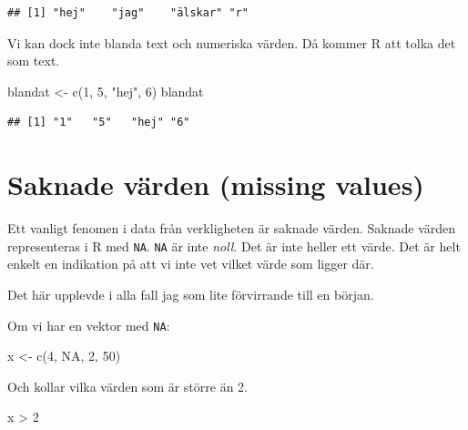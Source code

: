 \documentclass[
]{book}
\newenvironment{Shaded}{\begin{snugshade}}{\end{snugshade}}
\newcommand{\ConstantTok}[1]{\textcolor[rgb]{0.00,0.00,0.00}{#1}}
\newcommand{\DecValTok}[1]{\textcolor[rgb]{0.00,0.00,0.81}{#1}}
\newcommand{\FunctionTok}[1]{\textcolor[rgb]{0.00,0.00,0.00}{#1}}
\newcommand{\NormalTok}[1]{#1}
\newcommand{\OtherTok}[1]{\textcolor[rgb]{0.56,0.35,0.01}{#1}}
\newcommand{\SpecialCharTok}[1]{\textcolor[rgb]{0.00,0.00,0.00}{#1}}
\newcommand{\StringTok}[1]{\textcolor[rgb]{0.31,0.60,0.02}{#1}}
\begin{document}
\begin{verbatim}
## [1] "hej"    "jag"    "älskar" "r"
\end{verbatim}

Vi kan dock inte blanda text och numeriska värden. Då kommer R att tolka det som text.

\begin{Shaded}
\begin{Highlighting}[]
\NormalTok{blandat }\OtherTok{\textless{}{-}} \FunctionTok{c}\NormalTok{(}\DecValTok{1}\NormalTok{, }\DecValTok{5}\NormalTok{, }\StringTok{"hej"}\NormalTok{, }\DecValTok{6}\NormalTok{)}
\NormalTok{blandat}
\end{Highlighting}
\end{Shaded}

\begin{verbatim}
## [1] "1"   "5"   "hej" "6"
\end{verbatim}

\hypertarget{saknade-vuxe4rden-missing-values}{%
\section{Saknade värden (missing values)}\label{saknade-vuxe4rden-missing-values}}

Ett vanligt fenomen i data från verkligheten är saknade värden. Saknade värden representeras i R med \texttt{NA}.
\texttt{NA} är inte \emph{noll}. Det är inte heller ett värde. Det är helt enkelt en indikation på att vi inte vet vilket värde som ligger där.

Det här upplevde i alla fall jag som lite förvirrande till en början.

Om vi har en vektor med \texttt{NA}:

\begin{Shaded}
\begin{Highlighting}[]
\NormalTok{x }\OtherTok{\textless{}{-}} \FunctionTok{c}\NormalTok{(}\DecValTok{4}\NormalTok{, }\ConstantTok{NA}\NormalTok{, }\DecValTok{2}\NormalTok{, }\DecValTok{50}\NormalTok{)}
\end{Highlighting}
\end{Shaded}

Och kollar vilka värden som är större än 2.

\begin{Shaded}
\begin{Highlighting}[]
\NormalTok{x }\SpecialCharTok{\textgreater{}} \DecValTok{2} 
\end{Highlighting}
\end{Shaded}
\end{document}
